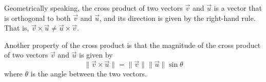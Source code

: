 \documentclass{report}
\begin{document}
Geometrically speaking, the cross product of two vectors $\vec{v}$ and
$\vec{u}$ is a vector that is orthogonal to both $\vec{v}$ and $\vec{u}$, and
its direction is given by the right-hand rule. That is, $\vec{v} \times \vec{u}
    \neq \vec{u} \times \vec{v}$. \vspace{1em}
\begin{center}
\end{center}

Another property of the cross product is that the magnitude of the cross
product of two vectors $\vec{v}$ and $\vec{u}$ is given by \[\lVert \vec{v} \times \vec{u} \rVert = \lVert \vec{v} \rVert \lVert \vec{u} \rVert \sin\theta\] where $\theta$ is the angle between the two vectors.
\end{document}
